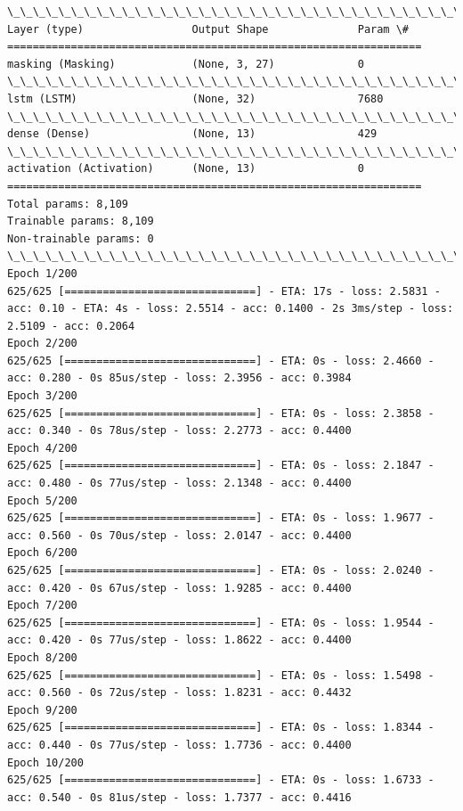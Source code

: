 \documentclass[11pt]{article}
\begin{document}
    \begin{Verbatim}[commandchars=\\\{\}]
\_\_\_\_\_\_\_\_\_\_\_\_\_\_\_\_\_\_\_\_\_\_\_\_\_\_\_\_\_\_\_\_\_\_\_\_\_\_\_\_\_\_\_\_\_\_\_\_\_\_\_\_\_\_\_\_\_\_\_\_\_\_\_\_\_
Layer (type)                 Output Shape              Param \#   
=================================================================
masking (Masking)            (None, 3, 27)             0         
\_\_\_\_\_\_\_\_\_\_\_\_\_\_\_\_\_\_\_\_\_\_\_\_\_\_\_\_\_\_\_\_\_\_\_\_\_\_\_\_\_\_\_\_\_\_\_\_\_\_\_\_\_\_\_\_\_\_\_\_\_\_\_\_\_
lstm (LSTM)                  (None, 32)                7680      
\_\_\_\_\_\_\_\_\_\_\_\_\_\_\_\_\_\_\_\_\_\_\_\_\_\_\_\_\_\_\_\_\_\_\_\_\_\_\_\_\_\_\_\_\_\_\_\_\_\_\_\_\_\_\_\_\_\_\_\_\_\_\_\_\_
dense (Dense)                (None, 13)                429       
\_\_\_\_\_\_\_\_\_\_\_\_\_\_\_\_\_\_\_\_\_\_\_\_\_\_\_\_\_\_\_\_\_\_\_\_\_\_\_\_\_\_\_\_\_\_\_\_\_\_\_\_\_\_\_\_\_\_\_\_\_\_\_\_\_
activation (Activation)      (None, 13)                0         
=================================================================
Total params: 8,109
Trainable params: 8,109
Non-trainable params: 0
\_\_\_\_\_\_\_\_\_\_\_\_\_\_\_\_\_\_\_\_\_\_\_\_\_\_\_\_\_\_\_\_\_\_\_\_\_\_\_\_\_\_\_\_\_\_\_\_\_\_\_\_\_\_\_\_\_\_\_\_\_\_\_\_\_
Epoch 1/200
625/625 [==============================] - ETA: 17s - loss: 2.5831 - acc: 0.10 - ETA: 4s - loss: 2.5514 - acc: 0.1400 - 2s 3ms/step - loss: 2.5109 - acc: 0.2064
Epoch 2/200
625/625 [==============================] - ETA: 0s - loss: 2.4660 - acc: 0.280 - 0s 85us/step - loss: 2.3956 - acc: 0.3984
Epoch 3/200
625/625 [==============================] - ETA: 0s - loss: 2.3858 - acc: 0.340 - 0s 78us/step - loss: 2.2773 - acc: 0.4400
Epoch 4/200
625/625 [==============================] - ETA: 0s - loss: 2.1847 - acc: 0.480 - 0s 77us/step - loss: 2.1348 - acc: 0.4400
Epoch 5/200
625/625 [==============================] - ETA: 0s - loss: 1.9677 - acc: 0.560 - 0s 70us/step - loss: 2.0147 - acc: 0.4400
Epoch 6/200
625/625 [==============================] - ETA: 0s - loss: 2.0240 - acc: 0.420 - 0s 67us/step - loss: 1.9285 - acc: 0.4400
Epoch 7/200
625/625 [==============================] - ETA: 0s - loss: 1.9544 - acc: 0.420 - 0s 77us/step - loss: 1.8622 - acc: 0.4400
Epoch 8/200
625/625 [==============================] - ETA: 0s - loss: 1.5498 - acc: 0.560 - 0s 72us/step - loss: 1.8231 - acc: 0.4432
Epoch 9/200
625/625 [==============================] - ETA: 0s - loss: 1.8344 - acc: 0.440 - 0s 77us/step - loss: 1.7736 - acc: 0.4400
Epoch 10/200
625/625 [==============================] - ETA: 0s - loss: 1.6733 - acc: 0.540 - 0s 81us/step - loss: 1.7377 - acc: 0.4416

\end{Verbatim}
\end{document}
